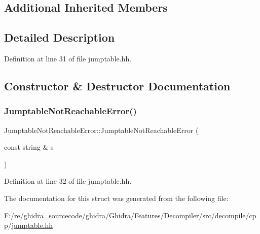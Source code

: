 \subsection*{Additional Inherited Members}


\subsection{Detailed Description}


Definition at line 31 of file jumptable.\+hh.



\subsection{Constructor \& Destructor Documentation}
\mbox{\label{struct_jumptable_not_reachable_error_a5755f35d07aa25ba9113f1ac524cb51c}} 
\subsubsection{\texorpdfstring{JumptableNotReachableError()}{JumptableNotReachableError()}}
{\footnotesize\ttfamily Jumptable\+Not\+Reachable\+Error\+::\+Jumptable\+Not\+Reachable\+Error (\begin{DoxyParamCaption}\item[{const string \&}]{s }\end{DoxyParamCaption})\hspace{0.3cm}{\ttfamily [inline]}}



Definition at line 32 of file jumptable.\+hh.



The documentation for this struct was generated from the following file\+:\begin{DoxyCompactItemize}
\item 
F\+:/re/ghidra\+\_\+sourcecode/ghidra/\+Ghidra/\+Features/\+Decompiler/src/decompile/cpp/\mbox{\hyperlink{jumptable_8hh}{jumptable.\+hh}}\end{DoxyCompactItemize}
